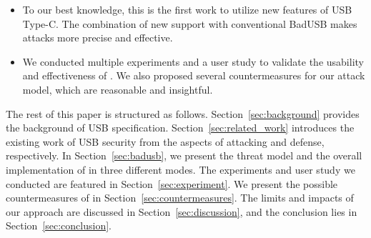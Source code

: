 \begin{itemize} 
    
    \item To our best knowledge, this is the first work to utilize new features
	of \ac{USB} Type-C.  The combination of new support with conventional BadUSB
	makes attacks more precise and effective.
	
	
    \item We conducted multiple experiments and a user study to validate the
	usability and effectiveness of \tool.  We also proposed several
	countermeasures for our attack model, which are reasonable and
	insightful. 
\end{itemize}

The rest of this paper is structured as follows.  Section~\ref{sec:background}
provides the background of \ac{USB} specification.  Section~\ref{sec:related_work}
introduces the existing work of \ac{USB} security from the aspects of attacking and
defense, respectively.  In Section~\ref{sec:badusb}, we present the threat model
and the overall implementation of \tool in three different modes.  The
experiments and user study we conducted are featured in
Section~\ref{sec:experiment}.  We present the possible countermeasures of \tool
in Section~\ref{sec:countermeasures}.  The limits and impacts of our approach
are discussed in Section~\ref{sec:discussion}, and the conclusion lies in
Section~\ref{sec:conclusion}.














